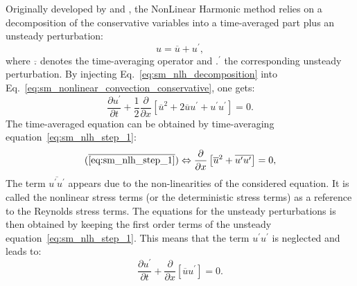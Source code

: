 
Originally developed by \citet{He1998} and \citet{Ning1998},
the NonLinear Harmonic method
relies on a decomposition of the conservative variables into a
time-averaged part plus an unsteady perturbation:
\begin{equation}
	u = \overline{u} + u^\prime,
	\label{eq:sm_nlh_decomposition}
\end{equation}
where $\overline{.}$ denotes the time-averaging operator and
$.^\prime$ the corresponding unsteady perturbation.
By injecting Eq.~\ref{eq:sm_nlh_decomposition} into
Eq.~\ref{eq:sm_nonlinear_convection_conservative}, one gets:
\begin{equation}
	\frac{\partial u^\prime}{\partial t} + 
	\frac{1}{2}\frac{\partial}{\partial x} \left[
	\overline{u}^2 + 2 \overline{u} u^\prime + u^\prime u^\prime \right] = 
	0.
	\label{eq:sm_nlh_step_1}
\end{equation}
The time-averaged equation can be obtained by time-averaging
equation~\ref{eq:sm_nlh_step_1}:
\begin{equation}
	(\overline{\ref{eq:sm_nlh_step_1}})
	\Leftrightarrow
	\frac{\partial}{\partial x}
	\left[\overline{u}^2 + 
	\overline{u^\prime u^\prime}\right] =
	0,
	\label{eq:sm_nlh_step_2}
\end{equation}
The term $\overline{u^\prime u^\prime}$
appears due to the non-linearities of the considered equation. It
is called the nonlinear stress terms 
(or the deterministic stress terms) as a reference to 
the Reynolds stress terms. 
The equations for the unsteady perturbations is then obtained by keeping
the first order terms of the unsteady equation~\ref{eq:sm_nlh_step_1}.
This means that the term $u^\prime u^\prime$ is neglected and leads
to:
\begin{equation}
	\frac{\partial u^\prime}{\partial t} + 
	\frac{\partial}{\partial x} \left[\overline{u} u^\prime \right] = 
	0.
\end{equation}

